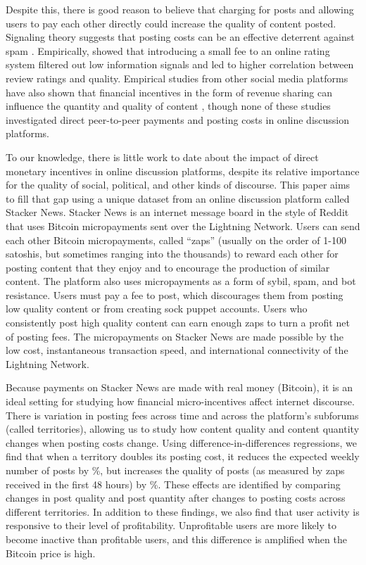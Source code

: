 Despite this, there is good reason to believe that charging for posts and allowing users to pay each other directly could increase the quality of content posted. Signaling theory suggests that posting costs can be an effective deterrent against spam  \citep{joseph2008email}. Empirically, \citet{tchernichovski2019pnas} showed that introducing a small fee to an online rating system filtered out low information signals and led to higher correlation between review ratings and quality. Empirical studies from other social media platforms have also shown that financial incentives in the form of revenue sharing can influence the quantity and quality of content  \citep{sun2013blogs, elkomboz2023youtube, kerkhof2024youtube}, though none of these studies investigated direct peer-to-peer payments and posting costs in online discussion platforms.

To our knowledge, there is little work to date about the impact of direct monetary incentives in online discussion platforms, despite its relative importance for the quality of social, political, and other kinds of discourse. This paper aims to fill that gap using a unique dataset from an online discussion platform called Stacker News. Stacker News is an internet message board in the style of Reddit that uses Bitcoin micropayments sent over the Lightning Network. Users can send each other Bitcoin micropayments, called ``zaps'' (usually on the order of 1-100 satoshis, but sometimes ranging into the thousands) to reward each other for posting content that they enjoy and to encourage the production of similar content. The platform also uses micropayments as a form of sybil, spam, and bot resistance. Users must pay a fee to post, which discourages them from posting low quality content or from creating sock puppet accounts. Users who consistently post high quality content can earn enough zaps to turn a profit net of posting fees. The micropayments on Stacker News are made possible by the low cost, instantaneous transaction speed, and international connectivity of the Lightning Network. 

Because payments on Stacker News are made with real money (Bitcoin), it is an ideal setting for studying how financial micro-incentives affect internet discourse. There is variation in posting fees across time and across the platform's subforums (called territories), allowing us to study how content quality and content quantity changes when posting costs change. Using difference-in-differences regressions, we find that when a territory doubles its posting cost, it reduces the expected weekly number of posts by \%, but increases the quality of posts (as measured by zaps received in the first 48 hours) by \%. These effects are identified by comparing changes in post quality and post quantity after changes to posting costs across different territories. In addition to these findings, we also find that user activity is responsive to their level of profitability. Unprofitable users are more likely to become inactive than profitable users, and this difference is amplified when the Bitcoin price is high. 

